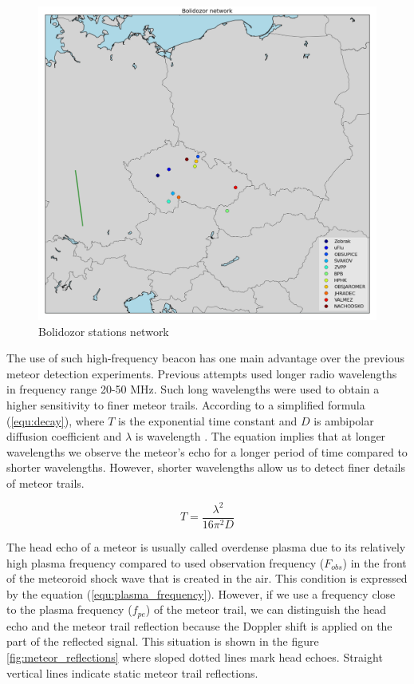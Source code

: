 \documentclass[twoside]{ctuthesis}
\theoremstyle{plain}
\theoremstyle{definition}
\theoremstyle{note}
\begin{document}
\begin{figure}
 \begin{center}
 \includegraphics[width=\linewidth]{./img/stanice_mapa.png}
 \caption{Bolidozor stations network}
  \label{fig:stanice_mapa} 
 \end{center}
\end{figure}
                   
The use of such high-frequency beacon has one main advantage over the previous meteor detection experiments.
Previous attempts used longer radio wavelengths in frequency range 20-50 MHz. Such long wavelengths were used to obtain a higher sensitivity to finer meteor trails. According to a simplified formula (\ref{equ:decay}), where $T$ is the exponential time constant and $D$ is ambipolar diffusion coefficient and $\lambda$ is wavelength \cite{Decay_time}. The equation implies that at longer wavelengths we observe the meteor's echo for a longer period of time compared to shorter wavelengths. However, shorter wavelengths allow us to detect finer details of meteor trails.

\begin{equation}
T = \frac{\lambda^2}{16 \pi ^2 D}
\label{equ:decay}
\end{equation}

The head echo of a meteor is usually called overdense plasma due to its relatively high plasma frequency compared to used observation frequency ($F_{obs}$) in the front of the meteoroid shock wave that is created in the air. This condition is expressed by the equation (\ref{equ:plasma_frequency}). However, if we use a frequency close to the plasma frequency ($f_{pe}$) of the meteor trail, we can distinguish the head echo and the meteor trail reflection because the Doppler shift is applied on the part of the reflected signal. This situation is shown in the figure \ref{fig:meteor_reflections} where sloped dotted lines mark head echoes. Straight vertical lines indicate static meteor trail reflections.
\end{document}
